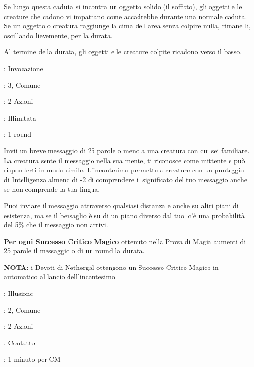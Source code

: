 \begin{multicols}{2}
Se lungo questa caduta si incontra un oggetto solido (il soffitto), gli oggetti e le creature che cadono vi impattano come accadrebbe durante una normale caduta. Se un oggetto o creatura raggiunge la cima dell'area senza colpire nulla, rimane lì, oscillando lievemente, per la durata.

Al termine della durata, gli oggetti e le creature colpite ricadono verso il basso.

\noindent\colorbox{OBSSgold!10}{
\begin{minipage}{0.95\linewidth}
\begin{description}[noitemsep, topsep=0pt, parsep=0pt, partopsep=0pt, leftmargin=0cm, labelwidth=1.3cm]
	\item[\textbf{Lista}]: Invocazione
	\item[\textbf{Livello}]: 3, Comune
	\item[\textbf{Lancio}]: 2 Azioni
	\item[\textbf{Gittata}]: Illimitata
	\item[\textbf{Durata}]: 1 round
\end{description}
\end{minipage}}\smallskip

Invii un breve messaggio di 25 parole o meno a una creatura con cui sei familiare. La creatura sente il messaggio nella sua mente, ti riconosce come mittente e può risponderti in modo simile. L'incantesimo permette a creature con un punteggio di Intelligenza almeno di -2 di comprendere il significato del tuo messaggio anche se non comprende la tua lingua.

Puoi inviare il messaggio attraverso qualsiasi distanza e anche su altri piani di esistenza, ma se il bersaglio è su di un piano diverso dal tuo, c'è una probabilità del 5\% che il messaggio non arrivi.

\textbf{Per ogni Successo Critico Magico} ottenuto nella Prova di Magia aumenti di 25 parole il messaggio o di un round la durata.

\textbf{NOTA}: i Devoti di Nethergal ottengono un Successo Critico Magico in automatico al lancio dell'incantesimo

\noindent\colorbox{OBSSgold!10}{
\begin{minipage}{0.95\linewidth}
\begin{description}[noitemsep, topsep=0pt, parsep=0pt, partopsep=0pt, leftmargin=0cm, labelwidth=1.3cm]
	\item[\textbf{Lista}]: Illusione
	\item[\textbf{Livello}]: 2, Comune
	\item[\textbf{Lancio}]: 2 Azioni
	\item[\textbf{Gittata}]: Contatto
	\item[\textbf{Durata}]: 1 minuto per CM
\end{description}
\end{minipage}}\smallskip


\end{multicols}
